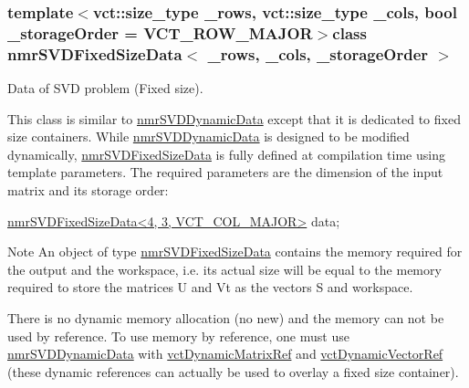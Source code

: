 \subsubsection*{template$<$vct\-::size\-\_\-type \-\_\-rows, vct\-::size\-\_\-type \-\_\-cols, bool \-\_\-storage\-Order = V\-C\-T\-\_\-\-R\-O\-W\-\_\-\-M\-A\-J\-O\-R$>$class nmr\-S\-V\-D\-Fixed\-Size\-Data$<$ \-\_\-rows, \-\_\-cols, \-\_\-storage\-Order $>$}

Data of S\-V\-D problem (Fixed size). 

This class is similar to \hyperlink{classnmr_s_v_d_dynamic_data}{nmr\-S\-V\-D\-Dynamic\-Data} except that it is dedicated to fixed size containers. While \hyperlink{classnmr_s_v_d_dynamic_data}{nmr\-S\-V\-D\-Dynamic\-Data} is designed to be modified dynamically, \hyperlink{classnmr_s_v_d_fixed_size_data}{nmr\-S\-V\-D\-Fixed\-Size\-Data} is fully defined at compilation time using template parameters. The required parameters are the dimension of the input matrix and its storage order\-: 
\begin{DoxyCode}
\hyperlink{classnmr_s_v_d_fixed_size_data}{nmrSVDFixedSizeData<4, 3, VCT\_COL\_MAJOR>} data;
\end{DoxyCode}


\begin{DoxyNote}{Note}
An object of type \hyperlink{classnmr_s_v_d_fixed_size_data}{nmr\-S\-V\-D\-Fixed\-Size\-Data} contains the memory required for the output and the workspace, i.\-e. its actual size will be equal to the memory required to store the matrices U and Vt as the vectors S and workspace.

There is no dynamic memory allocation (no {\ttfamily new}) and the memory can not be used by reference. To use memory by reference, one must use \hyperlink{classnmr_s_v_d_dynamic_data}{nmr\-S\-V\-D\-Dynamic\-Data} with \hyperlink{classvct_dynamic_matrix_ref}{vct\-Dynamic\-Matrix\-Ref} and \hyperlink{classvct_dynamic_vector_ref}{vct\-Dynamic\-Vector\-Ref} (these dynamic references can actually be used to overlay a fixed size container). 
\end{DoxyNote}



